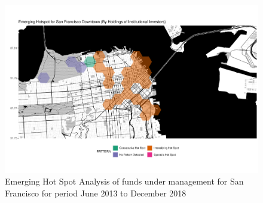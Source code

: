 \begin{figure}
	\centering
	\includegraphics[width=1\linewidth]{Figures/ChapterIV/SF_Money_EH_Downtown}
	\caption[Emerging Hot Spot Analysis of Funds Under Management for Downtown San Francisco 2013-2018]{Emerging Hot Spot Analysis of funds under management for San Francisco for period June 2013 to December 2018}
	\label{fig:SFnmoneyhotspot_Downtown}
\end{figure}


